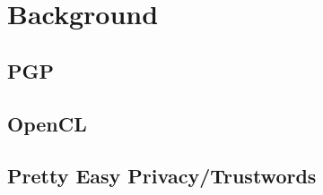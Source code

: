 \chapter{Background}
\label{cha:Background}

\section{PGP}

\section{OpenCL}

\section{Pretty Easy Privacy/Trustwords}